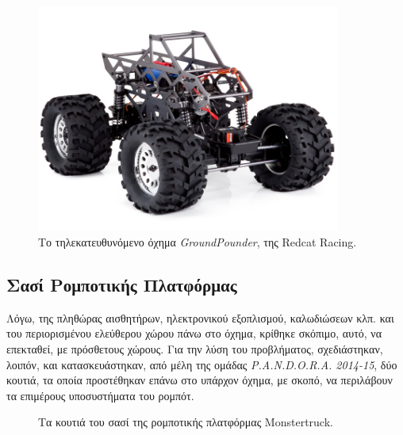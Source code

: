 \begin{figure}[!ht]
	\begin{center}
		\includegraphics[width=10cm]{Chapters/Chapter2/Figures/groundpounder.jpg}
		\caption{Το τηλεκατευθυνόμενο όχημα \textit{GroundPounder}, της Redcat Racing.}
		\label{fig:groundpounder}
	\end{center}
\end{figure}

\bigskip
\subsection{Σασί Ρομποτικής Πλατφόρμας} \label{ssec:chassis}
Λόγω, της πληθώρας αισθητήρων, ηλεκτρονικού εξοπλισμού, καλωδιώσεων κλπ. και του περιορισμένου ελεύθερου χώρου πάνω στο όχημα, κρίθηκε σκόπιμο, αυτό, να επεκταθεί, με πρόσθετους χώρους. Για την λύση του προβλήματος, σχεδιάστηκαν, λοιπόν, και κατασκευάστηκαν, από μέλη της ομάδας \textit{P.A.N.D.O.R.A. 2014-15}, δύο κουτιά, τα οποία προστέθηκαν επάνω στο υπάρχον όχημα, με σκοπό, να περιλάβουν τα επιμέρους υποσυστήματα του ρομπότ.

\begin{figure}[!ht]
	\centering
	\caption{Τα κουτιά του σασί της ρομποτικής πλατφόρμας Monstertruck.}
\end{figure}

